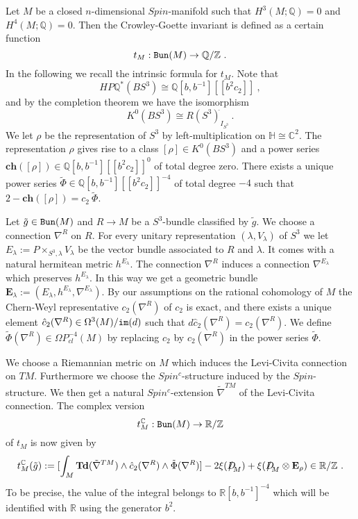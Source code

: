 \documentclass[12pt]{article}
\newcommand{\Bun}{{\tt Bun}}
\newcommand{\im}{{\tt im}}
\newcommand{\Z}{{\mathbb{Z}}}
\newcommand{\Q}{{\mathbb{Q}}}
\newcommand{\R}{{\mathbb{R}}}
\newcommand{\C}{{\mathbb{C}}}
\newcommand{\Td}{{\mathbf{Td}}}
\newcommand{\ch}{{\mathbf{ch}}}
\newcommand{\bE}{{\mathbf{E}}}
\newcommand{\Dirac}{{D\hspace{-0.27cm}/}}
\begin{document}
Let $M$ be a closed $n$-dimensional $Spin$-manifold
such that $H^{3}(M;\Q)=0$ and $H^{4}(M;\Q)=0$. Then the Crowley-Goette invariant is defined as a certain function
$$t_{M}:\Bun(M)\to \Q/\Z\ .$$
In the following we recall the intrinsic formula \cite[(1.9)]{2010arXiv1012.5237C} for $t_{M}$.
Note that $$HP\Q^{*}(BS^{3})\cong \Q[b,b^{-1}][[b^{2}c_{2}]]\ ,$$ and by the completion theorem \cite{MR0259946} we have the isomorphism
$$K^{0}(BS^{3})\cong R(S^{3})^{\hat{}}_{I_{S^{3}}}\ .$$
We let $\rho$ be the  representation of $S^{3}$ by left-multiplication on $\mathbb{H}\cong \C^{2}$.
The representation $\rho$ gives rise to a class
$[\rho]\in K^{0}(BS^{3})$ and a power series
$\ch([\rho])\in \Q[b,b^{-1}][[b^{2}c_{2}]]^{0}$ of total degree zero. There exists a unique power series
$\tilde \Phi\in  \Q[b,b^{-1}][[b^{2}c_{2}]]^{-4}$ of total degree $-4$ such that
$2-\ch([\rho])=c_{2}\ \tilde \Phi$.

Let $\tilde g\in \Bun(M)$ and $R\to M$ be a $S^{3}$-bundle classified by $\tilde g$.
We choose a connection $\nabla^{R}$ on $R$. For every unitary representation $(\lambda,V_{\lambda})$ of $S^{3}$ we let $E_{\lambda}:=P\times_{S^{3},\lambda}V_{\lambda}$ be the vector bundle associated to $R$ and $\lambda$. It comes with a natural hermitean metric $h^{E_{\lambda}}$. The connection $\nabla^{R}$ induces a connection $\nabla^{E_{\lambda}}$ which preserves  $h^{E_{\lambda}}$. In this way we get a geometric bundle $\bE_{\lambda}:=(E_{\lambda},h^{E_{\lambda}},\nabla^{E_{\lambda}})$. By our assumptions on the rational cohomology  of $M$ the Chern-Weyl representative  $c_{2}(\nabla^{R})$ of $c_{2}$ is exact, and there exists a unique element $\hat c_{2}(\nabla^{R})\in \Omega^{3}(M)/\im(d)$ such that $d\hat c_{2}(\nabla^{R})=c_{2}(\nabla^{R})$.
We define  $\tilde \Phi(\nabla^{R})\in \Omega P_{cl}^{-4}(M)$ by  replacing $c_{2}$ by  $c_{2}(\nabla^{R})$ in the power series $\tilde \Phi$.



We choose a Riemannian metric on $M$ which induces the Levi-Civita connection on $TM$.
Furthermore we choose the $Spin^{c}$-structure induced by the $Spin$-structure. We then get a natural
$Spin^{c}$-extension $\tilde \nabla^{TM}$ of the Levi-Civita connection.
The complex version
$$t_{M}^{\C}:\Bun(M)\to \R/\Z$$ of $t_{M}$ is now given by 
\cite[(1.9)]{2010arXiv1012.5237C}
\begin{equation}\label{cg2}t^{\C}_{M}(\tilde g):=[\int_{M}\Td(\tilde \nabla^{TM})\wedge \hat c_{2}(\nabla^{R})\wedge \tilde \Phi(\nabla^{R})]-2\xi(\Dirac_{M}) + \xi(\Dirac_{M}\otimes \bE_{\rho})\in \R/\Z\ .\end{equation}
 To be precise, the value of the integral belongs to $\R[b,b^{-1}]^{-4}$ which will be identified with $\R$ using the generator $b^{2}$.
\end{document}
